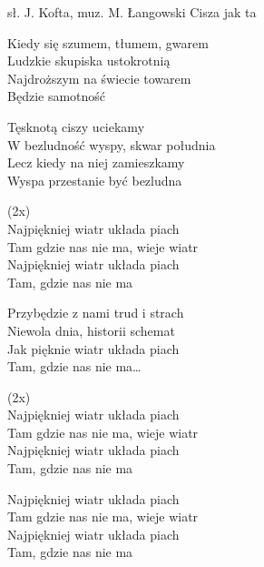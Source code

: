 {sł. J. Kofta, muz. M. Łangowski}
{Cisza jak ta}
\begin{text}
\hfill\break
Kiedy się szumem, tłumem, gwarem \\
Ludzkie skupiska ustokrotnią \\
Najdroższym na świecie towarem \\
Będzie samotność

\hfill\break
Tęsknotą ciszy uciekamy \\
W bezludność wyspy, skwar południa \\
Lecz kiedy na niej zamieszkamy \\
Wyspa przestanie być bezludna

\vin (2x)\\
\vin Najpiękniej wiatr układa piach \\
\vin Tam gdzie nas nie ma, wieje wiatr \\
\vin Najpiękniej wiatr układa piach \\
\vin Tam, gdzie nas nie ma

Przybędzie z nami trud i strach \\
Niewola dnia, historii schemat \\
Jak pięknie wiatr układa piach \\
Tam, gdzie nas nie ma…

\vin (2x)\\
\vin Najpiękniej wiatr układa piach \\
\vin Tam gdzie nas nie ma, wieje wiatr \\
\vin Najpiękniej wiatr układa piach \\
\vin Tam, gdzie nas nie ma

\hfill\break
\vin Najpiękniej wiatr układa piach \\
\vin Tam gdzie nas nie ma, wieje wiatr \\
\vin Najpiękniej wiatr układa piach \\
\vin Tam, gdzie nas nie ma
\end{text}
